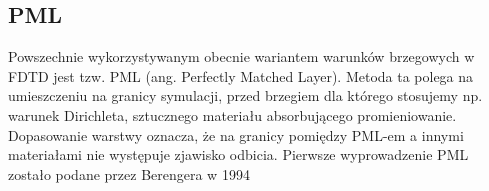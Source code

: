 \subsection{PML}
\label{art:pml}
Powszechnie wykorzystywanym obecnie wariantem warunków brzegowych w FDTD jest tzw. PML (ang. Perfectly Matched Layer). Metoda ta polega na umieszczeniu na granicy symulacji, przed brzegiem dla którego stosujemy np. warunek Dirichleta, sztucznego materiału absorbującego promieniowanie. Dopasowanie warstwy oznacza, że na granicy pomiędzy PML-em a innymi materiałami nie występuje zjawisko odbicia. Pierwsze wyprowadzenie PML zostało podane przez Berengera w 1994 \cite{1994JCoPh.114..185B} 



